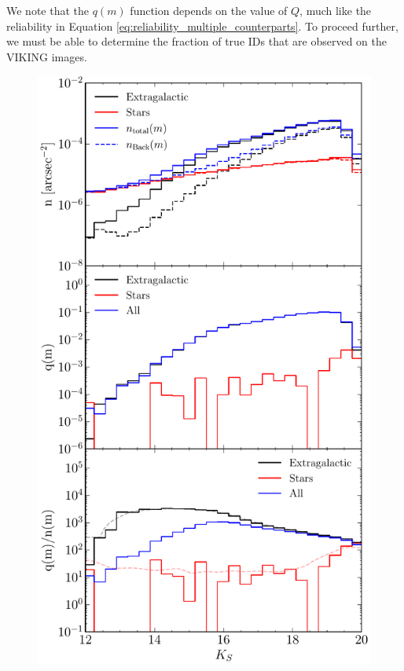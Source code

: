 We note that the $q(m)$ function depends on the value of $Q$, much like the reliability in Equation \ref{eq:reliability_multiple_counterparts}. To proceed further, we must be able to determine the fraction of true IDs that are observed on the VIKING images.

\begin{figure}
    \centering
	\includegraphics[height=0.75\textheight]{Figures/Figure_2_3.pdf}

\end{figure}
